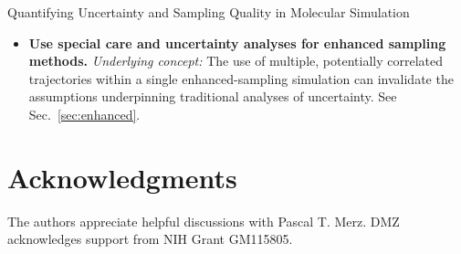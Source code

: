 \documentclass[9pt,bestpractices]{livecoms}
\begin{document}
\begin{Checklists*}[p!]
\begin{checklist}{Quantifying Uncertainty and Sampling Quality in Molecular Simulation}
\begin{itemize}
\item
\textbf{Use special care and uncertainty analyses for enhanced sampling methods.}  \emph{Underlying concept:} The use of multiple, potentially correlated trajectories within a single enhanced-sampling simulation can invalidate the assumptions underpinning traditional analyses of uncertainty.  See Sec.\ \ref{sec:enhanced}.
\end{itemize}
\end{checklist}
\end{Checklists*}










\section{Acknowledgments}
The authors appreciate helpful discussions with Pascal T. Merz.
DMZ acknowledges support from NIH Grant GM115805.



%
\end{document}
